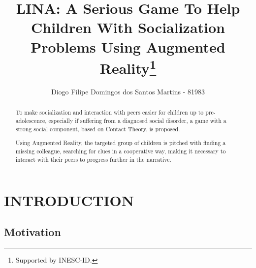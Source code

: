 \documentclass[runningheads]{llncs}
\begin{document}
\title{LINA: A Serious Game To Help Children With Socialization Problems Using Augmented Reality\thanks{Supported by INESC-ID.}}


\author{Diogo Filipe Domingos dos Santos Martins - 81983}




\maketitle              %

\begin{abstract}
To make socialization and interaction with peers easier for children up to pre-adolescence, especially if suffering from a diagnosed social disorder, a game with a strong social component, based on Contact Theory, is proposed. 
\par Using Augmented Reality, the targeted group of children is pitched with finding a missing colleague, searching for clues in a cooperative way, making it necessary to interact with their peers to progress further in the narrative.

\end{abstract}
%
%
%

\section{INTRODUCTION}

\subsection{Motivation}
\end{document}
